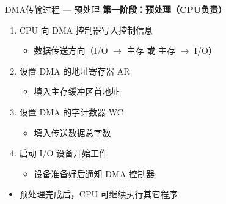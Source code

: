\documentclass[10pt, aspectratio=169]{beamer}
\begin{document}
\begin{frame}{DMA传输过程 --- 预处理}
    \textbf{第一阶段：预处理（CPU负责）}
    \vspace{0.3em}
    \begin{enumerate}
        \item CPU 向 DMA 控制器写入控制信息
            \begin{itemize}
                \item 数据传送方向（I/O $\rightarrow$ 主存 或 主存 $\rightarrow$ I/O）
            \end{itemize}
        \item 设置 DMA 的地址寄存器 AR
            \begin{itemize}
                \item 填入主存缓冲区首地址
            \end{itemize}
        \item 设置 DMA 的字计数器 WC
            \begin{itemize}
                \item 填入传送数据总字数
            \end{itemize}
        \item 启动 I/O 设备开始工作
            \begin{itemize}
                \item 设备准备好后通知 DMA 控制器
            \end{itemize}
    \end{enumerate}
    \vspace{0.3em}
    \begin{itemize}
        \item 预处理完成后，CPU 可继续执行其它程序
    \end{itemize}
\end{frame}
\end{document}
